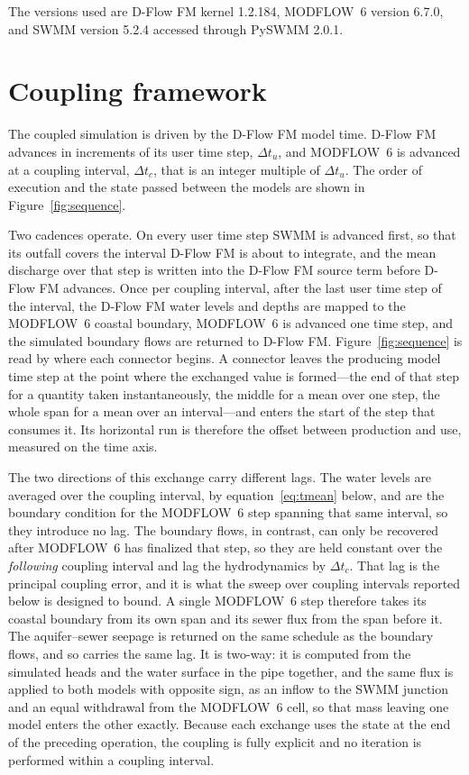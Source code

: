 \documentclass[preprint,authoryear,11pt]{elsarticle}
\begin{document}
The versions used are D-Flow FM kernel 1.2.184, MODFLOW~6 version 6.7.0, and SWMM version 5.2.4 accessed through PySWMM 2.0.1.

\section{Coupling framework}

The coupled simulation is driven by the D-Flow FM model time. D-Flow FM advances in increments of its user time step, $\Delta t_u$, and MODFLOW~6 is advanced at a coupling interval, $\Delta t_c$, that is an integer multiple of $\Delta t_u$. The order of execution and the state passed between the models are shown in Figure~\ref{fig:sequence}.

Two cadences operate. On every user time step SWMM is advanced first, so that its outfall covers the interval D-Flow FM is about to integrate, and the mean discharge over that step is written into the D-Flow FM source term before D-Flow FM advances. Once per coupling interval, after the last user time step of the interval, the D-Flow FM water levels and depths are mapped to the MODFLOW~6 coastal boundary, MODFLOW~6 is advanced one time step, and the simulated boundary flows are returned to D-Flow FM. Figure~\ref{fig:sequence} is read by where each connector begins. A connector leaves the producing model time step at the point where the exchanged value is formed---the end of that step for a quantity taken instantaneously, the middle for a mean over one step, the whole span for a mean over an interval---and enters the start of the step that consumes it. Its horizontal run is therefore the offset between production and use, measured on the time axis.

The two directions of this exchange carry different lags. The water levels are averaged over the coupling interval, by equation~\ref{eq:tmean} below, and are the boundary condition for the MODFLOW~6 step spanning that same interval, so they introduce no lag. The boundary flows, in contrast, can only be recovered after MODFLOW~6 has finalized that step, so they are held constant over the \emph{following} coupling interval and lag the hydrodynamics by $\Delta t_c$. That lag is the principal coupling error, and it is what the sweep over coupling intervals reported below is designed to bound. A single MODFLOW~6 step therefore takes its coastal boundary from its own span and its sewer flux from the span before it. The aquifer--sewer seepage is returned on the same schedule as the boundary flows, and so carries the same lag. It is two-way: it is computed from the simulated heads and the water surface in the pipe together, and the same flux is applied to both models with opposite sign, as an inflow to the SWMM junction and an equal withdrawal from the MODFLOW~6 cell, so that mass leaving one model enters the other exactly. Because each exchange uses the state at the end of the preceding operation, the coupling is fully explicit and no iteration is performed within a coupling interval.
\end{document}
